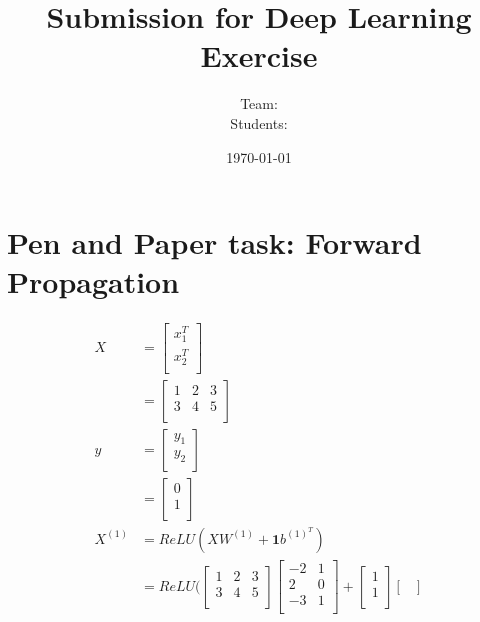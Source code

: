 \documentclass[addpoints]{exam}
\title{Submission for Deep Learning Exercise \assignmentnumber}
\author{Team: \teamname\\Students: \students}
\date{\today}
\begin{document}
    \maketitle


    \section*{Pen and Paper task: Forward Propagation}
    \begin{align*}
        X & = \begin{bmatrix}
        x_1^T\\
        x_2^T\\
        \end{bmatrix}\\
        & = \begin{bmatrix}
        1 & 2 & 3\\
        3 & 4 & 5\\
        \end{bmatrix}\\
        y & = \begin{bmatrix}
        y_1\\
        y_2\\
        \end{bmatrix}\\
        & = \begin{bmatrix}
        0\\
        1\\
        \end{bmatrix}\\
        X^{(1)} &= ReLU(XW^{(1)}+\textbf{1}b^{(1)}^T)\\
        &= ReLU(\begin{bmatrix}
        1 & 2 & 3\\
        3 & 4 & 5\\
        \end{bmatrix}\begin{bmatrix}
            -2 & 1\\
            2 & 0\\
            -3 & 1\\
        \end{bmatrix} + 
        \begin{bmatrix}
            1\\
            1\\
        \end{bmatrix}\begin{bmatrix}

\end{bmatrix}
\end{align*}
\end{document}
